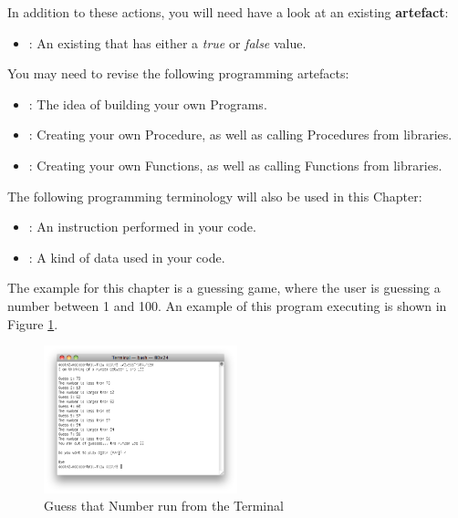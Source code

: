 In addition to these actions, you will need have a look at an existing \textbf{artefact}:
\begin{itemize}
  \item {}: An existing  that has either a \emph{true} or \emph{false} value.
\end{itemize}

\bigskip

You may need to revise the following programming artefacts:
\begin{itemize}
  \item {}: The idea of building your own Programs.
  \item {}: Creating your own Procedure, as well as calling Procedures from libraries.
  \item {}: Creating your own Functions, as well as calling Functions from libraries.
\end{itemize}

The following programming terminology will also be used in this Chapter:
\begin{itemize}
  \item {}: An instruction performed in your code.
  \item {}: A kind of data used in your code.
\end{itemize}

The example for this chapter is a guessing game, where the user is guessing a number between 1 and 100. An example of this program executing is shown in Figure \ref{fig:control-flow-guess-num}.

\begin{figure}[h]
   \centering
   \includegraphics[width=0.5\textwidth]{./topics/control-flow/images/GuessThatNumber} 
   \caption[Guess That Number Terminal]{Guess that Number run from the Terminal}
   \label{fig:control-flow-guess-num}
\end{figure}

